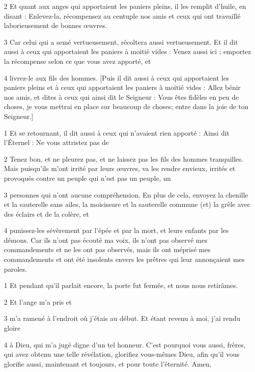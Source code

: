 \par 2 Et quant aux anges qui apportaient les paniers pleins, il les remplit d'huile, en disant : Enlevez-la, récompensez au centuple nos amis et ceux qui ont travaillé laborieusement de bonnes œuvres.

\par 3 Car celui qui a semé vertueusement, récoltera aussi vertueusement. Et il dit aussi à ceux qui apportaient les paniers à moitié vides : Venez aussi ici ; emportez la récompense selon ce que vous avez apporté, et

\par 4 livrez-le aux fils des hommes. [Puis il dit aussi à ceux qui apportaient les paniers pleins et à ceux qui apportaient les paniers à moitié vides : Allez bénir nos amis, et dites à ceux qui ainsi dit le Seigneur : Vous êtes fidèles en peu de choses, je vous mettrai en place sur beaucoup de choses; entre dans la joie de ton Seigneur.]


\par 1 Et se retournant, il dit aussi à ceux qui n'avaient rien apporté : Ainsi dit l'Éternel : Ne vous attristez pas de

\par 2 Tenez bon, et ne pleurez pas, et ne laissez pas les fils des hommes tranquilles. Mais puisqu'ils m'ont irrité par leurs œuvres, va les rendre envieux, irrités et provoqués contre un peuple qui n'est pas un peuple, un

\par 3 personnes qui n'ont aucune compréhension. En plus de cela, envoyez la chenille et la sauterelle sans ailes, la moisissure et la sauterelle commune (et) la grêle avec des éclairs et de la colère, et

\par 4 punissez-les sévèrement par l'épée et par la mort, et leurs enfants par les démons. Car ils n'ont pas écouté ma voix, ils n'ont pas observé mes commandements et ne les ont pas observés, mais ils ont méprisé mes commandements et ont été insolents envers les prêtres qui leur annonçaient mes paroles.


\par 1 Et pendant qu'il parlait encore, la porte fut fermée, et nous nous retirâmes.

\par 2 Et l'ange m'a pris et

\par 3 m'a ramené à l'endroit où j'étais au début. Et étant revenu à moi, j'ai rendu gloire

\par 4 à Dieu, qui m'a jugé digne d'un tel honneur. C'est pourquoi vous aussi, frères, qui avez obtenu une telle révélation, glorifiez vous-mêmes Dieu, afin qu'il vous glorifie aussi, maintenant et toujours, et pour toute l'éternité. Amen.

